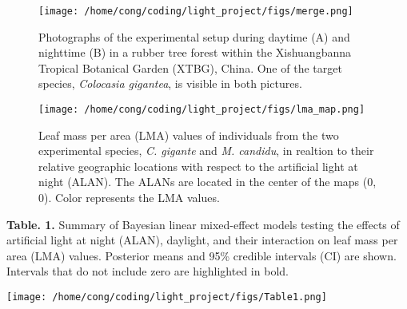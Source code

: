 \documentclass[
  12pt,
  letterpaper,
  DIV=11,
  numbers=noendperiod]{scrartcl}
\begin{document}
\newpage

\begin{figure}

{\centering \texttt{[image: /home/cong/coding/light\_project/figs/merge.png]}

}

\caption{\label{fig-alan}Photographs of the experimental setup during
daytime (A) and nighttime (B) in a rubber tree forest within the
Xishuangbanna Tropical Botanical Garden (XTBG), China. One of the target
species, \emph{Colocasia gigantea}, is visible in both pictures.}

\end{figure}

\newpage

\begin{figure}

{\centering \texttt{[image: /home/cong/coding/light\_project/figs/lma\_map.png]}

}

\caption{\label{fig-LMA}Leaf mass per area (LMA) values of individuals
from the two experimental species, \emph{C. gigante} and \emph{M.
candidu}, in realtion to their relative geographic locations with
respect to the artificial light at night (ALAN). The ALANs are located
in the center of the maps (0, 0). Color represents the LMA values.}

\end{figure}

\newpage

\textbf{Table. 1.} Summary of Bayesian linear mixed-effect models
testing the effects of artificial light at night (ALAN), daylight, and
their interaction on leaf mass per area (LMA) values. Posterior means
and 95\% credible intervals (CI) are shown. Intervals that do not
include zero are highlighted in bold.

\texttt{[image: /home/cong/coding/light\_project/figs/Table1.png]}
\end{document}
